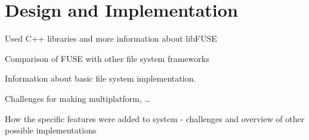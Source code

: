 \chapter{Design and Implementation}

Used C++ libraries and more information about libFUSE

Comparison of FUSE with other file system frameworks

Information about basic file system implementation.

Challenges for making multiplatform, \ldots

How the specific features were added to system - challenges and overview of other possible implementations